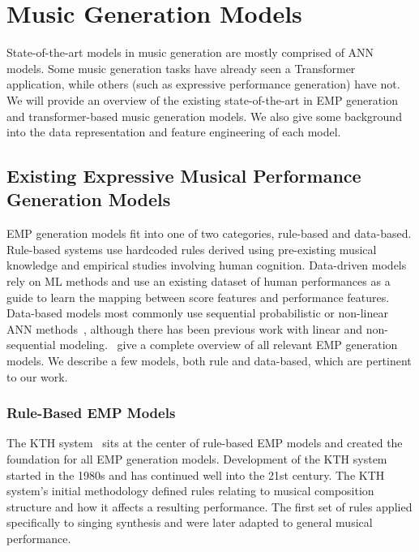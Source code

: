 \chapter{Music Generation Models}\label{ch:ch4}
State-of-the-art models in music generation are mostly comprised of ANN models. Some music generation tasks have already seen a Transformer application, while others (such as expressive performance generation) have not. We will provide an overview of the existing state-of-the-art in EMP generation and transformer-based music generation models. We also give some background into the data representation and feature engineering of each model. 

\section{Existing Expressive Musical Performance Generation Models}\label{sec:emp_generation_models}
EMP generation models fit into one of two categories, rule-based and data-based. Rule-based systems use hardcoded rules derived using pre-existing musical knowledge and empirical studies involving human cognition. Data-driven models rely on ML methods and use an existing dataset of human performances as a guide to learn the mapping between score features and performance features. Data-based models most commonly use sequential probabilistic or non-linear ANN methods~\cite{cancino2018computational}, although there has been previous work with linear and non-sequential modeling.~\citet{cancino2018computational} give a complete overview of all relevant EMP generation models. We describe a few models, both rule and data-based, which are pertinent to our work. 

\subsection{Rule-Based EMP Models}
The KTH system~\cite{friberg2006overview} sits at the center of rule-based EMP models and created the foundation for all EMP generation models. Development of the KTH system started in the 1980s and has continued well into the 21st century. The KTH system's initial methodology defined rules relating to musical composition structure and how it affects a resulting performance. The first set of rules applied specifically to singing synthesis and were later adapted to general musical performance. 

